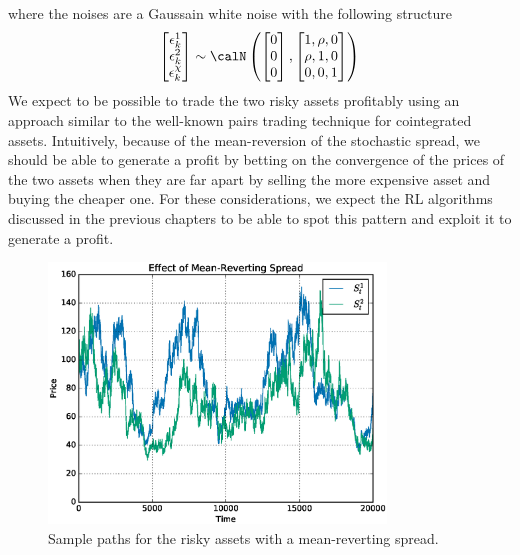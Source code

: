 where the noises are a Gaussain white noise with the following structure
\begin{equation}
	\begin{bmatrix}
	  	\epsilon_k^1\\
	  	\epsilon_k^2\\
	  	\epsilon_k^\chi\\	  
	\end{bmatrix} \sim \calN\left( 
	\begin{bmatrix}
		  	0\\
		  	0\\
		  	0\\	  
	\end{bmatrix}, 
	\begin{bmatrix}
		  	1, \rho, 0\\
		  	\rho, 1, 0\\
		  	0, 0, 1\\	  
	\end{bmatrix}	
	\right)
\end{equation}
We expect to be possible to trade the two risky assets profitably using an approach similar to the well-known pairs trading technique for cointegrated assets. Intuitively, because of the mean-reversion of the stochastic spread, we should be able to generate a profit by betting on the convergence of the prices of the two assets when they are far apart by selling the more expensive asset and buying the cheaper one. For these considerations, we expect the RL algorithms discussed in the previous chapters to be able to spot this pattern and exploit it to generate a profit. 

\begin{figure}[t!]
	\centering
	\includegraphics[width=0.8\textwidth]{Images/8_cointegrated_series}
	\caption[Sample paths for the risky assets with a mean-reverting spread.]{Sample paths for the risky assets with a mean-reverting spread.}
	\label{fig:cointegrated_series}
\end{figure}

